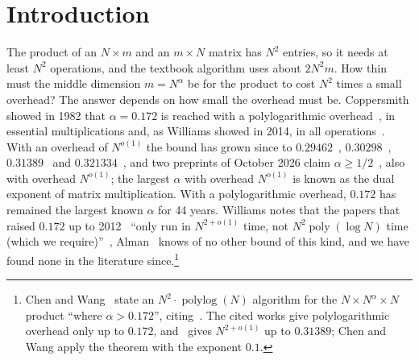 \documentclass[11pt]{article}
\theoremstyle{definition}
\theoremstyle{remark}
\DeclareMathOperator{\polylog}{polylog}
\DeclareMathOperator{\poly}{poly}
\begin{document}
\section{Introduction}\label{sec:intro}

The product of an $N\times m$ and an $m\times N$ matrix has $N^2$ entries, so it needs at least $N^2$ operations, and the textbook algorithm uses about $2N^2m$. How thin must the middle dimension $m=N^\alpha$ be for the product to cost $N^2$ times a small overhead? The answer depends on how small the overhead must be. Coppersmith showed in 1982 that $\alpha=0.172$ is reached with a polylogarithmic overhead~\cite{Cop82}, in essential multiplications and, as Williams showed in 2014, in all operations~\cite{Wil14b}. With an overhead of $N^{o(1)}$ the bound has grown since to $0.29462$~\cite{Cop97}, $0.30298$~\cite{LG12}, $0.31389$~\cite{LGU18} and $0.321334$~\cite{VXXZ24}, and two preprints of October 2026 claim $\alpha\ge1/2$~\cite{AvBZ26,Uzn26}, also with overhead $N^{o(1)}$; the largest $\alpha$ with overhead $N^{o(1)}$ is known as the dual exponent of matrix multiplication. With a polylogarithmic overhead, $0.172$ has remained the largest known $\alpha$ for 44 years. Williams notes that the papers that raised $0.172$ up to 2012~\cite{Cop97,HP98,KZHP08,LG12} ``only run in $N^{2+o(1)}$ time, not $N^2\poly(\log N)$ time (which we require)''~\cite[p.~18]{Wil14b}, Alman~\cite[footnote~4]{Alm21} knows of no other bound of this kind, and we have found none in the literature since.\footnote{Chen and Wang~\cite[Theorem~2.1]{CW19} state an $N^2\cdot\polylog(N)$ algorithm for the $N\times N^\alpha\times N$ product ``where $\alpha>0.172$'', citing~\cite{Cop82,LGU18}. The cited works give polylogarithmic overhead only up to $0.172$, and~\cite{LGU18} gives $N^{2+o(1)}$ up to $0.31389$; Chen and Wang apply the theorem with the exponent $0.1$.}
\end{document}
